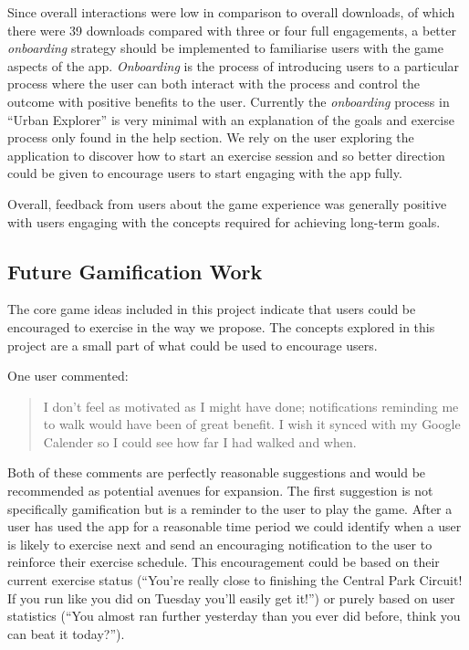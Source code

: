 Since overall interactions were low in comparison to overall downloads,
of which there were 39 downloads compared with three or four full
engagements, a better \emph{onboarding} strategy should be implemented
to familiarise users with the game aspects of the
app. \emph{Onboarding} is the process of introducing users to a
particular process where the user can both interact with the process
and control the outcome with positive benefits to the user. Currently
the \emph{onboarding} process in ``Urban Explorer'' is very minimal
with an explanation of the goals and exercise process only found in
the help section. We rely on the user exploring the application to
discover how to start an exercise session and so better direction 
could be given to encourage users to start engaging with the app
fully. 

Overall, feedback from users about the game experience was generally
positive with users engaging with the concepts required for achieving
long-term goals. 

\subsection{Future Gamification Work}
The core game ideas included in this project indicate that users could
be encouraged to exercise in the way we propose. The concepts explored
in this project are a small part of what could be used to encourage
users. 

One user commented:
\begin{quote}
  I don't feel as motivated as I might have done; notifications
  reminding me to walk would have been of great benefit. I wish it
  synced with my Google Calender so I could see how far I had walked
  and when. 
\end{quote}
Both of these comments are perfectly reasonable suggestions and would
be recommended as potential avenues for expansion. The first
suggestion is not specifically gamification but is a reminder to the
user to play the game. After a user has used the app for a reasonable
time period we could identify when a user is likely to exercise next
and send an encouraging notification to the user to reinforce their
exercise schedule. This encouragement could be based on their current
exercise status (``You're really close to finishing the Central Park
Circuit! If you run like you did on Tuesday you'll easily get it!'')
or purely based on user statistics (``You almost ran further yesterday
than you ever did before, think you can beat it today?''). 

